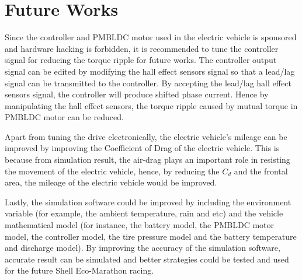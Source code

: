 \section{Future Works}
Since the controller and PMBLDC motor used in the electric vehicle is sponsored and hardware hacking is forbidden, it is recommended to tune the controller signal for reducing the torque ripple for future works. The controller output signal can be edited by modifying the hall effect sensors signal so that a lead/lag signal can be transmitted to the controller. By accepting the lead/lag hall effect sensors signal, the controller will produce shifted phase current. Hence by manipulating the hall effect sensors, the torque ripple caused by mutual torque in PMBLDC motor can be reduced.

Apart from tuning the drive electronically, the electric vehicle's mileage can be improved by improving the Coefficient of Drag of the electric vehicle. This is because from simulation result, the air-drag plays an important role in resisting the movement of the electric vehicle, hence, by reducing the $C_{d}$ and the frontal area, the mileage of the electric vehicle would be improved.

Lastly, the simulation software could be improved by including the environment variable (for example, the ambient temperature, rain and etc) and the vehicle mathematical model (for instance, the battery model, the PMBLDC motor model, the controller model, the tire pressure model and the battery temperature and discharge model). By improving the accuracy of the simulation software, accurate result can be simulated and better strategies could be tested and used for the future Shell Eco-Marathon racing.

